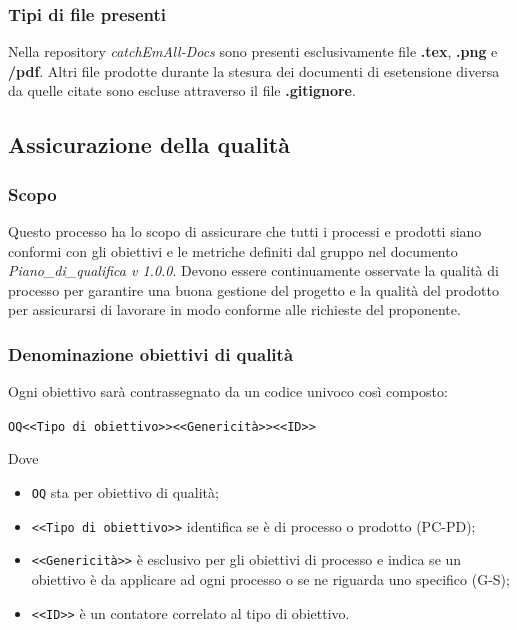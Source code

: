 \subsubsection{Tipi di file presenti}
Nella repository \textit{catchEmAll-Docs} sono presenti esclusivamente file \textbf{.tex}, \textbf{.png} e \textbf{/pdf}. Altri file prodotte durante la stesura dei documenti di esetensione diversa da quelle citate sono escluse attraverso il file \textbf{.gitignore}.



\subsection{Assicurazione della qualità}
\subsubsection{Scopo}
Questo processo ha lo scopo di assicurare che tutti i processi e prodotti siano conformi con gli obiettivi e le metriche definiti dal gruppo nel documento \textit{Piano\_di\_qualifica v 1.0.0}. 
Devono essere continuamente osservate la qualità di processo per garantire una buona gestione del progetto e la qualità del prodotto per assicurarsi di lavorare in modo conforme alle richieste del proponente.
\subsubsection{Denominazione obiettivi di qualità}
Ogni obiettivo sarà contrassegnato da un codice univoco così composto:
\begin{center}
	\verb|OQ<<Tipo di obiettivo>><<Genericità>><<ID>>|
\end{center}
Dove 
\begin{itemize}
	\item \verb|OQ| sta per obiettivo di qualità;
	\item \verb|<<Tipo di obiettivo>>| identifica se è di processo o prodotto (PC-PD);
	\item \verb|<<Genericità>>| è esclusivo per gli obiettivi di processo e indica se un obiettivo è da applicare ad ogni processo o se ne riguarda uno specifico (G-S);
	\item \verb|<<ID>>| è un contatore correlato al tipo di obiettivo.
\end{itemize}
